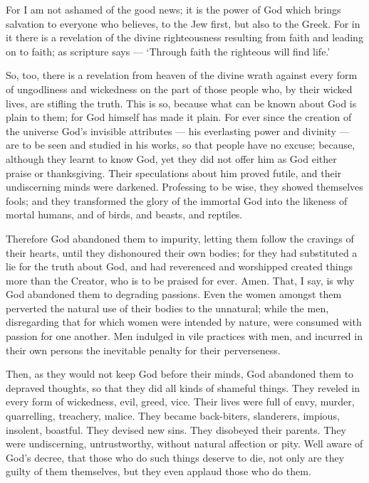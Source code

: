  For I am not ashamed of the good news; it is the power of
God which brings salvation to everyone who believes, to the Jew first,
but also to the Greek.  For in it there is a revelation of
the divine righteousness resulting from faith and leading on to faith;
as scripture says --- `Through faith the righteous will find life.'

 So, too, there is a revelation from heaven of the divine
wrath against every form of ungodliness and wickedness on the part of
those people who, by their wicked lives, are stifling the truth.
 This is so, because what can be known about God is plain
to them; for God himself has made it plain.  For ever since
the creation of the universe God's invisible attributes --- his
everlasting power and divinity --- are to be seen and studied in his
works, so that people have no excuse;  because, although
they learnt to know God, yet they did not offer him as God either praise
or thanksgiving. Their speculations about him proved futile, and their
undiscerning minds were darkened.  Professing to be wise,
they showed themselves fools;  and they transformed the
glory of the immortal God into the likeness of mortal humans, and of
birds, and beasts, and reptiles.

 Therefore God abandoned them to impurity, letting them
follow the cravings of their hearts, until they dishonoured their own
bodies;  for they had substituted a lie for the truth about
God, and had reverenced and worshipped created things more than the
Creator, who is to be praised for ever. Amen.  That, I say,
is why God abandoned them to degrading passions. Even the women amongst
them perverted the natural use of their bodies to the unnatural;
 while the men, disregarding that for which women were
intended by nature, were consumed with passion for one another. Men
indulged in vile practices with men, and incurred in their own persons
the inevitable penalty for their perverseness.

 Then, as they would not keep God before their minds, God
abandoned them to depraved thoughts, so that they did all kinds of
shameful things.  They reveled in every form of wickedness,
evil, greed, vice. Their lives were full of envy, murder, quarrelling,
treachery, malice.  They became back-biters, slanderers,
impious, insolent, boastful. They devised new sins. They disobeyed their
parents.  They were undiscerning, untrustworthy, without
natural affection or pity.  Well aware of God's decree,
that those who do such things deserve to die, not only are they guilty
of them themselves, but they even applaud those who do them.

